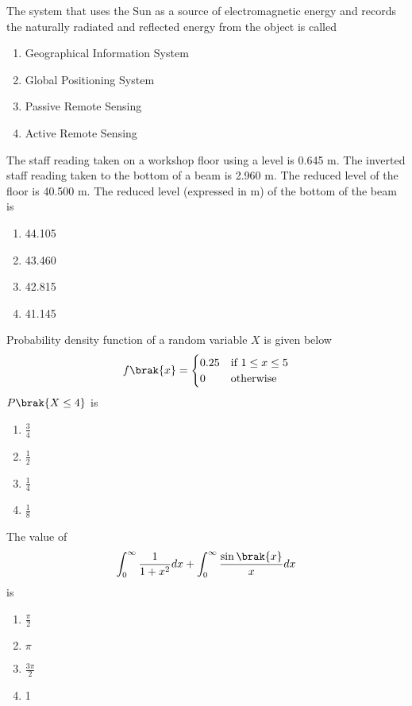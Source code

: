 \item The system that uses the Sun as a source of electromagnetic energy and records the naturally radiated and reflected energy from the object is called
\begin{enumerate}
    \item Geographical Information System
    \item Global Positioning System
\item Passive Remote Sensing
\item Active Remote Sensing \\
\end{enumerate}
\item The staff reading taken on a workshop floor using a level is 0.645 m. The inverted staff reading taken to the bottom of a beam is 2.960 m. The reduced level of the floor is 40.500 m. The reduced level (expressed in m) of the bottom of the beam is 
\begin{enumerate}
    \item 44.105
    \item 43.460
    \item 42.815
    \item 41.145 \\
\end{enumerate}
\item Probability density function of a random variable $X$ is given below
\begin{align*}
    f\brak{x} = \begin{cases}
        0.25 & \text{if}\ 1 \leq x \leq 5 \\
        0 & \text{otherwise}
    \end{cases}
\end{align*}
$P\brak{X \leq 4}$ is
  \begin{enumerate}
   \item $\frac{3}{4}$
   \item $\frac{1}{2}$
   \item $\frac{1}{4}$
   \item $\frac{1}{8}$ \\
\end{enumerate}
\item The value of 
\begin{align*}
    \int_{0}^{\infty}\frac{1}{1 + x^2}dx + \int_{0}^{\infty}\frac{\sin\brak{x}}{x}dx
\end{align*}
is
\begin{enumerate}
    \item $\frac{\pi}{2}$
    \item $\pi$
    \item $\frac{3\pi}{2}$
    \item 1 \\
\end{enumerate}
